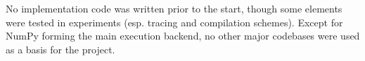 No implementation code was written prior to the start, though some elements were tested in experiments (esp. tracing and compilation schemes). Except for NumPy forming the main execution backend, no other major codebases were used as a basis for the project. 
